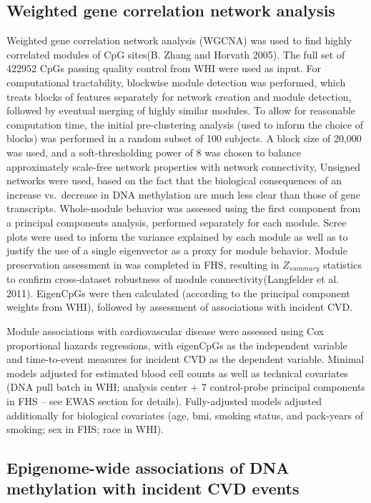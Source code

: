 \documentclass[]{article}
\theoremstyle{definition}
\theoremstyle{definition}
\theoremstyle{definition}
\theoremstyle{remark}
\begin{document}
\subsection{Weighted gene correlation network
analysis}\label{weighted-gene-correlation-network-analysis}

Weighted gene correlation network analysis (WGCNA) was used to find
highly correlated modules of CpG sites(B. Zhang and Horvath 2005). The
full set of 422952 CpGs passing quality control from WHI were used as
input. For computational tractability, blockwise module detection was
performed, which treats blocks of features separately for network
creation and module detection, followed by eventual merging of highly
similar modules. To allow for reasonable computation time, the initial
pre-clustering analysis (used to inform the choice of blocks) was
performed in a random subset of 100 subjects. A block size of 20,000 was
used, and a soft-thresholding power of 8 was chosen to balance
approximately scale-free network properties with network connectivity,
Unsigned networks were used, based on the fact that the biological
consequences of an increase vs.~decrease in DNA methylation are much
less clear than those of gene transcripts. Whole-module behavior was
assessed using the first component from a principal components analysis,
performed separately for each module. Scree plots were used to inform
the variance explained by each module as well as to justify the use of a
single eigenvector as a proxy for module behavior. Module preservation
assessment in was completed in FHS, resulting in \(Z_{summary}\)
statistics to confirm cross-dataset robustness of module
connectivity(Langfelder et al. 2011). EigenCpGs were then calculated
(according to the principal component weights from WHI), followed by
assessment of associations with incident CVD.

Module associations with cardiovascular disease were assessed using Cox
proportional hazards regressions, with eigenCpGs as the independent
variable and time-to-event measures for incident CVD as the dependent
variable. Minimal models adjusted for estimated blood cell counts as
well as technical covariates (DNA pull batch in WHI; analysis center + 7
control-probe principal components in FHS -- see EWAS section for
details). Fully-adjusted models adjusted additionally for biological
covariates (age, bmi, smoking status, and pack-years of smoking; sex in
FHS; race in WHI).

\subsection{Epigenome-wide associations of DNA methylation with incident
CVD
events}\label{epigenome-wide-associations-of-dna-methylation-with-incident-cvd-events}
\end{document}
